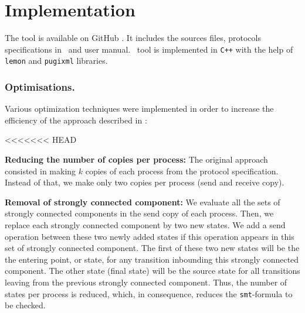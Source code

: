 \section{Implementation}
\label{sec:optim}

The tool is available on GitHub \cite{github.MPass}.
It includes the sources files, protocols specifications in \xml\ and user manual.
%
\MPass\ tool is implemented in \texttt{C++} with the help of {\tt lemon} and {\tt pugixml} libraries.

\subsubsection{Optimisations.}

Various optimization techniques were implemented in order to increase the efficiency of the approach described in  \cite{AAC13}:

<<<<<<< HEAD
\begin{description}
\item{\textbf{Reducing the number of copies per process:}}
The original approach consisted in making $k$ copies of each process from the protocol specification.
Instead of that, we make only two copies per process (send and receive copy).
%
\item{\textbf{Removal of strongly connected component:}}
We evaluate all the sets of strongly connected components in the send copy of each process. 
Then, we replace each strongly connected component by two new states.
We add a send operation between these two newly added states if this operation appears in this set of strongly connected component.
The first of these two new states will be the the entering point, or state, for any transition inbounding this strongly connected component.
The other state (final state) will be  the source state for all transitions leaving from the previous strongly connected component.
Thus, the number of states per process is reduced, which, in consequence, reduces the \texttt{smt}-formula to be checked.
\end{description}
